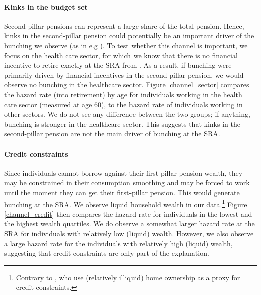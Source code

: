 \documentclass[12pt,a4paper]{article}
\begin{document}
\paragraph{Kinks in the budget set} Second pillar-pensions can represent a large share of the total pension. Hence, kinks in the second-pillar pension could potentially be an important driver of the bunching we observe (as in e.g \cite{Brown2013}). To test whether this channel is important, we focus on the health care sector, for which we know that there is no financial incentive to retire exactly at the SRA from \citet{kantarci_what_2020}. As a result, if bunching were primarily driven by financial incentives in the second-pillar pension, we would observe no bunching in the healthcare sector. %
Figure \ref{channel_sector} compares the hazard rate (into retirement) by age for individuals working in the health care sector (measured at age 60), to the hazard rate of individuals working in other sectors. We do not see any difference between the two groups; if anything, bunching is stronger in the healthcare sector. This suggests that kinks in the second-pillar pension are not the main driver of bunching at the SRA. 

\paragraph{Credit constraints} Since individuals cannot borrow against their first-pillar pension wealth, they may be constrained in their consumption smoothing and may be forced to work until the moment they can get their first-pillar pension. This would generate bunching at the SRA. We observe liquid household wealth in our data.\footnote{Contrary to \citet{cribb2016signals}, who use (relatively illiquid) home ownership as a proxy for credit constraints.} Figure \ref{channel_credit} then compares the hazard rate for individuals in the lowest and the highest wealth quartiles. We do observe a somewhat larger hazard rate at the SRA for individuals with relatively low (liquid) wealth. However, we also observe a large hazard rate for the individuals with relatively high (liquid) wealth, suggesting that credit constraints are only part of the explanation. 
\end{document}
